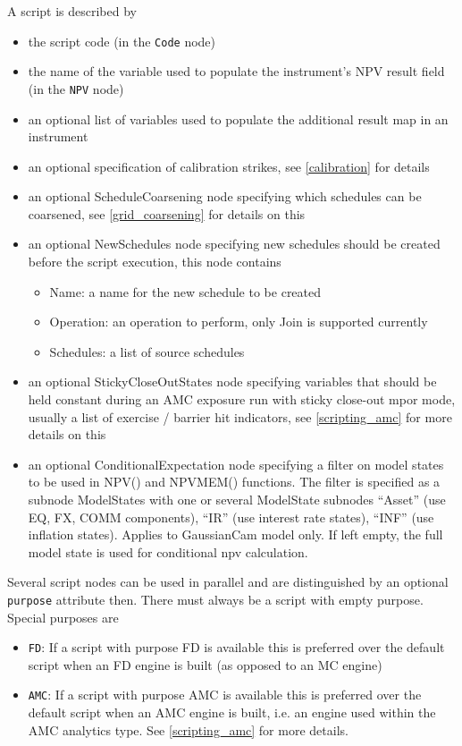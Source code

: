 A script is described by

\begin{itemize}
\item the script code (in the \verb+Code+ node)
\item the name of the variable used to populate the instrument's NPV result field (in the \verb+NPV+ node)
\item an optional list of variables used to populate the additional result map in an instrument
\item an optional specification of calibration strikes, see \ref{calibration} for details
\item an optional ScheduleCoarsening node specifying which schedules can be coarsened, see \ref{grid_coarsening} for details
  on this
\item an optional NewSchedules node specifying new schedules should be created before the script execution, this node
  contains
  \begin{itemize}
  \item Name: a name for the new schedule to be created
  \item Operation: an operation to perform, only Join is supported currently
  \item Schedules: a list of source schedules
  \end{itemize}
\item an optional StickyCloseOutStates node specifying variables that should be held constant during an AMC exposure run
  with sticky close-out mpor mode, usually a list of exercise / barrier hit indicators, see \ref{scripting_amc} for more
  details on this
\item an optional ConditionalExpectation node specifying a filter on model states to be used in NPV() and NPVMEM()
  functions. The filter is specified as a subnode ModelStates with one or several ModelState subnodes ``Asset'' (use EQ,
  FX, COMM components), ``IR'' (use interest rate states), ``INF'' (use inflation states). Applies to GaussianCam model
  only. If left empty, the full model state is used for conditional npv calculation.
\end{itemize}

Several script nodes can be used in parallel and are distinguished by an optional \verb+purpose+ attribute then. There
must always be a script with empty purpose. Special purposes are

\begin{itemize}
  \item \verb+FD+: If a script with purpose FD is available this is preferred over the default script when an FD engine
    is built (as opposed to an MC engine)
  \item \verb+AMC+: If a script with purpose AMC is available this is preferred over the default script when an AMC
    engine is built, i.e. an engine used within the AMC analytics type. See \ref{scripting_amc} for more details.
\end{itemize}

